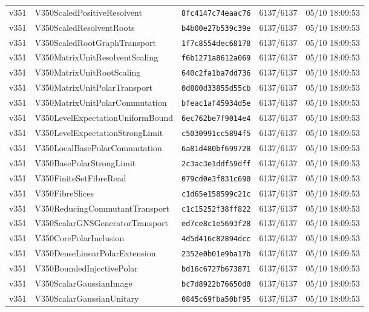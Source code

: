 \documentclass[11pt]{article}
\theoremstyle{definition}\newtheorem{deriv}{Derivação}
\begin{document}
{\begin{longtable}{@{}lllll@{}}
v351 & V350ScaledPositiveResolvent & \texttt{8fc4147c74eaac76} & 6137/6137 & 05/10 18:09:53 \\
v351 & V350ScaledResolventRoots & \texttt{b4b00e27b539c39e} & 6137/6137 & 05/10 18:09:53 \\
v351 & V350ScaledRootGraphTransport & \texttt{1f7c8554dec68178} & 6137/6137 & 05/10 18:09:53 \\
v351 & V350MatrixUnitResolventScaling & \texttt{f6b1271a8612a069} & 6137/6137 & 05/10 18:09:53 \\
v351 & V350MatrixUnitRootScaling & \texttt{640c2fa1ba7dd736} & 6137/6137 & 05/10 18:09:53 \\
v351 & V350MatrixUnitPolarTransport & \texttt{0d800d33855d55cb} & 6137/6137 & 05/10 18:09:53 \\
v351 & V350MatrixUnitPolarCommutation & \texttt{bfeac1af45934d5e} & 6137/6137 & 05/10 18:09:53 \\
v351 & V350LevelExpectationUniformBound & \texttt{6ec762be7f9014e4} & 6137/6137 & 05/10 18:09:53 \\
v351 & V350LevelExpectationStrongLimit & \texttt{c5030991cc5894f5} & 6137/6137 & 05/10 18:09:53 \\
v351 & V350LocalBasePolarCommutation & \texttt{6a81d480bf699728} & 6137/6137 & 05/10 18:09:53 \\
v351 & V350BasePolarStrongLimit & \texttt{2c3ac3e1ddf59dff} & 6137/6137 & 05/10 18:09:53 \\
v351 & V350FiniteSetFibreRead & \texttt{079cd0e3f831c690} & 6137/6137 & 05/10 18:09:53 \\
v351 & V350FibreSlices & \texttt{c1d65e158599c21c} & 6137/6137 & 05/10 18:09:53 \\
v351 & V350ReducingCommutantTransport & \texttt{c1c15252f38ff822} & 6137/6137 & 05/10 18:09:53 \\
v351 & V350ScalarGNSGeneratorTransport & \texttt{ed7ce8c1e5693f28} & 6137/6137 & 05/10 18:09:53 \\
v351 & V350CorePolarInclusion & \texttt{4d5d416c82894dcc} & 6137/6137 & 05/10 18:09:53 \\
v351 & V350DenseLinearPolarExtension & \texttt{2352e0b01e9ba17b} & 6137/6137 & 05/10 18:09:53 \\
v351 & V350BoundedInjectivePolar & \texttt{bd16c6727b673871} & 6137/6137 & 05/10 18:09:53 \\
v351 & V350ScalarGaussianImage & \texttt{bc7d8922b76650d0} & 6137/6137 & 05/10 18:09:53 \\
v351 & V350ScalarGaussianUnitary & \texttt{0845c69fba50bf95} & 6137/6137 & 05/10 18:09:53 \\

\end{longtable}}
\end{document}
